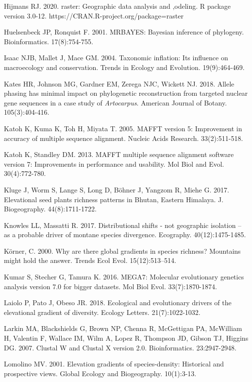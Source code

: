 Hijmans RJ. 2020. raster: Geographic data analysis and ,odeling. R package version 3.0-12. https://CRAN.R-project.org/package=raster

Huelsenbeck JP, Ronquist F. 2001. MRBAYES: Bayesian inference of phylogeny. Bioinformatics. 17(8):754-755.

Isaac NJB, Mallet J, Mace GM. 2004. Taxonomic inflation: Its influence on macroecology and conservation. Trends in Ecology and Evolution. 19(9):464-469.

Kates HR, Johnson MG, Gardner EM, Zerega NJC, Wickett NJ. 2018. Allele phasing has minimal impact on phylogenetic reconstruction from targeted nuclear gene sequences in a case study of \textit{Artocarpus}. American Journal of Botany. 105(3):404-416.

Katoh K, Kuma K, Toh H, Miyata T. 2005. MAFFT version 5: Improvement in accuracy of multiple sequence alignment. Nucleic Acids Research. 33(2):511-518.

Katoh K, Standley DM. 2013. MAFFT multiple sequence alignment software version 7: Improvements in performance and usability.  Mol Biol and Evol. 30(4):772-780.

Kluge J, Worm S, Lange S, Long D, Böhner J, Yangzom R, Miehe G. 2017. Elevational seed plants richness patterns in Bhutan, Eastern Himalaya. J. Biogeography. 44(8):1711-1722.

Knowles LL, Massatti R. 2017. Distributional shifts - not geographic isolation – as a probable driver of montane species divergence. Ecography. 40(12):1475-1485.

Körner, C. 2000. Why are there global gradients in species richness? Mountains might hold the answer. Trends Ecol Evol. 15(12):513–514.

Kumar S, Stecher G, Tamura K. 2016. MEGA7: Molecular evolutionary genetics analysis version 7.0 for bigger datasets. Mol Biol Evol. 33(7):1870-1874.

Laiolo P, Pato J, Obeso JR. 2018. Ecological and evolutionary drivers of the elevational gradient of diversity. Ecology Letters. 21(7):1022-1032.

Larkin MA, Blackshields G, Brown NP, Chenna R, McGettigan PA, McWilliam H, Valentin F, Wallace IM, Wilm A, Lopez R, Thompson JD, Gibson TJ, Higgins DG. 2007. Clustal W and Clustal X version 2.0. Bioinformatics. 23:2947-2948.

Lomolino MV. 2001. Elevation gradients of species-density: Historical and prospective views. Global Ecology and Biogeography. 10(1):3-13.

